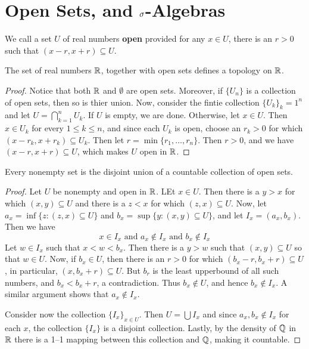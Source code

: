 
\section{Open Sets, and $\sigma$-Algebras}

\begin{definition}
    We call a set $U$ of real numbers \textbf{open} provided for any $x \in U$,
    there is an  $r>0$ such that  $(x-r,x+r) \subseteq U$.
\end{definition}

\begin{lemma}\label{lemma_1.1.1}
    The set of real numbers $\mathbb{R}$, together with open sets defines a topology on
     $\mathbb{R}$.
\end{lemma}
\begin{proof}
    Notice that both $\mathbb{R}$ and  $\emptyset$ are open sets. Moreover, if
    $\{U_n\}$ is a collection of open sets, then so is thier union. Now,
    consider the fintie collection $\{U_k\}_k=1^n$ and let
    $U=\bigcap_{k=1}^n{U_k}$. If $U$ is empty, we are done. Otherwise, let  $x
    \in U$. Then  $x \in U_k$ for every  $1 \leq k \leq n$, and since each
    $U_k$ is open, choose an  $r_k>0$ for which  $(x-r_k,x+r_k) \subseteq U_k$.
    Then let $r=\min{\{r_1, \dots ,r_n\}}$. Then $r>0$, and we have  $(x-r,x+r)
    \subseteq U$, which makes $U$ open in  $\mathbb{R}$.
\end{proof}

\begin{lemma}\label{lemma_1.1.2}
    Every nonempty set is the disjoint union of a countable collection of open
    sets.
\end{lemma}
\begin{proof}
    Let $U$ be nonempty and open in  $\mathbb{R}$. LEt  $x \in U$. Then there is a
    $y>x$ for which  $(x,y) \subseteq U$ and there is a $z<x$ for which  $(z,x)
    \subseteq U$. Now, let $a_x=\inf{\{z : (z,x) \subseteq U\}}$ and
    $b_x=\sup{\{y : (x,y) \subseteq U\}}$, and let $I_x=(a_x,b_x)$. Then we have
    \begin{equation*}
        x \in I_x \text{ and } a_x \notin I_x \text{ and } b_x \notin I_x
    \end{equation*}
    Let $w \in I_x$ such that  $x<w<b_x$. Then there is a  $y>w$ such that
    $(x,y) \subseteq U$ so that $w \in U$. Now, if  $b_x \in U$, then there is
    an  $r>0$ for which  $(b_x-r,b_x+r) \subseteq U$, in particular, $(x,b_x+r)
    \subseteq U$. But $b_r$ is the least upperbound of all such numbers, and
    $b_x<b_x+r$, a contradiction. Thus  $b_x \notin U$, and hence  $b_x \notin
    I_x$. A similar argument shows that  $a_x \notin I_x$.

    Consider now the collection  $\{I_x\}_{x \in U}$. Then $U=\bigcup{I_x}$ and
    since $a_x,b_x \notin I_x$ for each  $x$, the collection  $\{I_x\}$ is a
    disjoint collection. Lastly, by the density of $\mathbb{Q}$ in  $\mathbb{R}$ there is a 1--1
    mapping between this collection and $\mathbb{Q}$, making it countable.
\end{proof}

